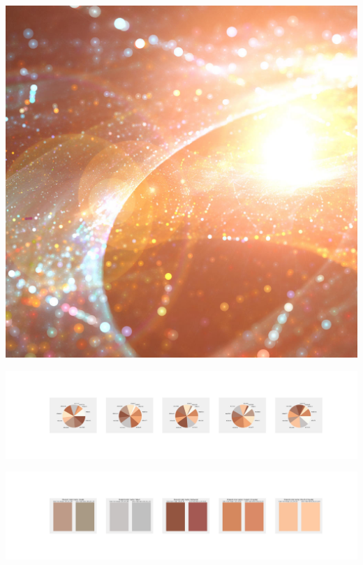\documentclass[11pt]{article}
\begin{document}
\begin{landscape}
    \begin{center}
    \includegraphics[width=\textwidth]{./nbimg/file (85).jpg}
    \end{center}

    \begin{center}
    \includegraphics[width=250mm]{./nbimg/pie-435.jpg}
    \end{center}

    \begin{center}
    \includegraphics[width=250mm]{./nbimg/peak-435.jpg}
    \end{center}
    


\end{landscape}
\end{document}
